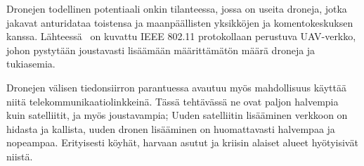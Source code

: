Dronejen todellinen potentiaali onkin tilanteessa, jossa on useita droneja,
jotka jakavat anturidataa toistensa ja maanpäällisten yksikköjen ja
komentokeskuksen kanssa. 
Lähteessä~\cite{Hayat2014} on kuvattu
IEEE 802.11 protokollaan perustuva UAV-verkko, johon pystytään joustavasti
lisäämään määrittämätön määrä droneja ja tukiasemia.

Dronejen välisen tiedonsiirron parantuessa avautuu myös mahdollisuus käyttää
niitä telekommunikaatiolinkkeinä. Tässä tehtävässä ne ovat paljon halvempia
kuin satelliitit, ja myös joustavampia; Uuden satelliitin lisääminen verkkoon
on hidasta ja kallista, uuden dronen lisääminen on huomattavasti halvempaa ja
nopeampaa.  Erityisesti köyhät, harvaan asutut ja kriisin alaiset alueet
hyötyisivät niistä.~\cite{Li2010}

